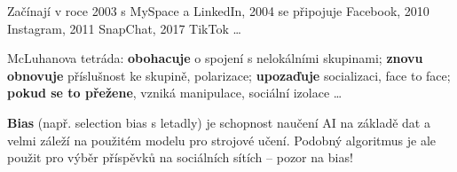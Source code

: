 Začínají v roce 2003 s MySpace a LinkedIn, 2004 se připojuje Facebook, 2010 Instagram, 2011 SnapChat, 2017 TikTok \ldots

\vspace{4pt}
\noindent McLuhanova tetráda: \textbf{obohacuje} o spojení s nelokálními skupinami; \textbf{znovu obnovuje} příslušnost ke skupině, polarizace; \textbf{upozaďuje} socializaci, face to face; \textbf{pokud se to přežene}, vzniká manipulace, sociální izolace \ldots

\vspace{4pt}
\noindent \textbf{Bias} (např. selection bias s letadly) je schopnost naučení AI na základě dat a velmi záleží na použitém modelu pro strojové učení. Podobný algoritmus je ale použit pro výběr příspěvků na sociálních sítích -- pozor na bias!
